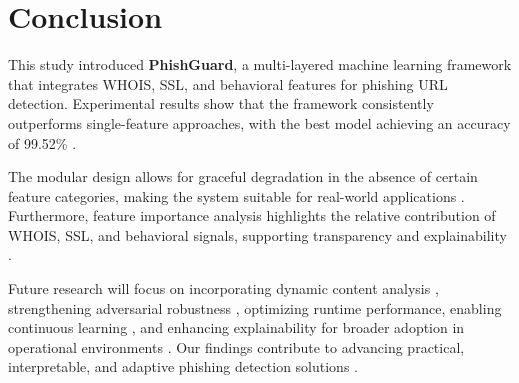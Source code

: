 \documentclass[conference]{IEEEtran}
\begin{document}
\section{Conclusion}
This study introduced \textbf{PhishGuard}, a multi-layered machine learning framework that integrates WHOIS, SSL, and behavioral features for phishing URL detection. Experimental results show that the framework consistently outperforms single-feature approaches, with the best model achieving an accuracy of 99.52\% \cite{oni2024phishing, mdpi2022improved}.  

The modular design allows for graceful degradation in the absence of certain feature categories, making the system suitable for real-world applications \cite{acm2024features, irep2025benchmarking}. Furthermore, feature importance analysis highlights the relative contribution of WHOIS, SSL, and behavioral signals, supporting transparency and explainability \cite{wiley2022explainable, arxiv2024featureimportance}.  

Future research will focus on incorporating dynamic content analysis \cite{academia2021urltran}, strengthening adversarial robustness \cite{wikipedia2025adversarial}, optimizing runtime performance, enabling continuous learning \cite{wired2018ai}, and enhancing explainability for broader adoption in operational environments \cite{wiley2022explainable}. Our findings contribute to advancing practical, interpretable, and adaptive phishing detection solutions \cite{frontiers2025multimodal, academia2022mlphishing}.




\end{document}
